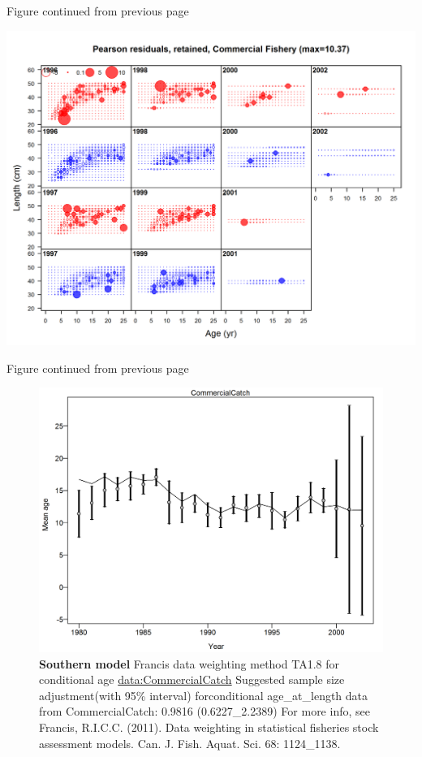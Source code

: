 \documentclass[12pt,]{article}
\begin{document}
\begin{center} 

            Figure continued from previous page 

            \end{center}

\includegraphics{./r4ss/plots_mod2/comp_condAALfit_residsflt2mkt2_page3.png}

\begin{center} 

            Figure continued from previous page 

            \end{center}

\begin{figure}[htbp]
\centering
\includegraphics{./r4ss/plots_mod2/comp_condAALfit_data_weighting_TA1.8_condAgeCommercialCatch.png}
\caption{\textbf{Southern model} Francis data weighting method TA1.8 for
conditional age \url{data:CommercialCatch} Suggested sample size
adjustment(with 95\% interval) forconditional age\_at\_length data from
CommercialCatch: 0.9816 (0.6227\_2.2389) For more info, see Francis,
R.I.C.C. (2011). Data weighting in statistical fisheries stock
assessment models. Can. J. Fish. Aquat. Sci. 68: 1124\_1138.
\label{fig:mod2_4_comp_condAALfit_data_weighting_TA1.8_condAgeCommercialCatch}}
\end{figure}
\end{document}
